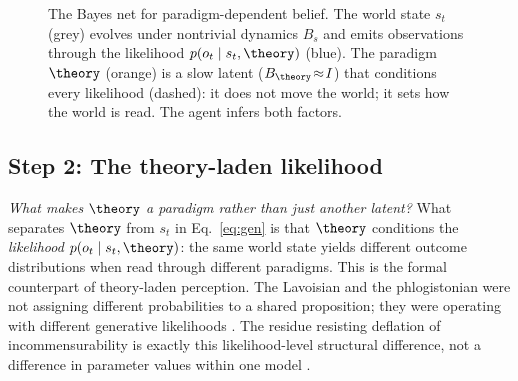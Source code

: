 \begin{figure}[t]
\centering
{}
\caption{The Bayes net for paradigm-dependent belief. The world
state $s_t$ (grey) evolves under nontrivial dynamics $B_s$ and emits
observations through the likelihood $p(o_t\mid s_t,\theory)$ (blue).
The paradigm $\theory$ (orange) is a slow latent
($B_\theory\!\approx\!I$) that conditions every likelihood (dashed):
it does not move the world; it sets how the world is read. The agent
infers both factors.}
\label{fig:factor}
\end{figure}

\subsection{Step 2: The theory-laden likelihood}
\label{ssec:likelihood}

\noindent\textit{What makes $\theory$ a \emph{paradigm} rather than
just another latent?} What separates $\theory$ from $s_t$ in
Eq.~\eqref{eq:gen} is that $\theory$ conditions the
\emph{likelihood} $p(o_t \mid s_t, \theory)$: the same world state
yields different outcome distributions when read through different
paradigms. This is the formal counterpart of theory-laden
perception. The Lavoisian and the phlogistonian were not assigning
different probabilities to a shared proposition; they were operating
with different generative likelihoods \citep{Chang2012_9,
Carrier2002_4}. The residue resisting deflation of incommensurability
is exactly this likelihood-level structural difference, not a
difference in parameter values within one model \citep{Malone1993_5}.


